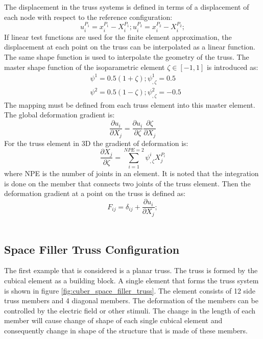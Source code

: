 The displacement in the truss systems is defined in terms of a displacement of each node with respect to the reference configuration: 
\begin{equation}
u^{P_1}_i=x^{P_1}_i-X^{P_1}_i ; u^{P_2}_i=x^{P_2}_i-X^{P_2}_i ;  
\end{equation}
If linear test functions are used for the finite element approximation, the displacement at each point on the truss can be interpolated as a linear function. The same shape function is used to interpolate the geometry of the truss. The master shape function of the isoparametric element $\zeta \in [-1,1]$ is introduced as:
\begin{equation}
\begin{aligned}
& \psi^1=0.5(1+\zeta); \psi^1_{,\zeta}= 0.5 \\
& \psi^2=0.5(1-\zeta); \psi^2_{,\zeta}=-0.5
\end{aligned}
\label{shape_function_truss} 
\end{equation}
The mapping must be defined from each truss element into this master element.
The global deformation gradient is:
\begin{equation}
\frac{\partial u_i}{\partial X_j}=\frac{\partial u_i}{\partial \zeta}
\frac{\partial \zeta}{\partial X_j}
\label{eqn:global_derivitave} 
\end{equation}
For the truss element in 3D the gradient of deformation is:
\begin{equation}
\frac{\partial X_j }{\partial \zeta}= 
  \sum_{i=1}^{NPE=2} \psi^i_{,\zeta} X^{P_i}_j 
\label{eqn:delXi_delzeta} 
\end{equation}
where NPE is the number of joints in an element.
It is noted that the integration is done on the member that connects two joints of the truss element.
Then the deformation gradient at a point on the truss is defined as:
\begin{equation}
F_{ij}=\delta_{ij}+ \frac{\partial u_i}{\partial X_j};  
\end{equation}
\\

\subsection{Space Filler Truss Configuration}
The first example that is considered is a planar truss.
The truss is formed by the cubical element as a building block. 
A single element that forms the truss system is shown in figure \ref{fig:cuber_space_filler_truss}.
The element consists of 12 side truss members and 4 diagonal members.
The deformation of the members can be controlled by the electric field or other stimuli.
The change in the length of each member will cause change of shape of each single cubical element and consequently change in shape of the structure that is made of these members.

